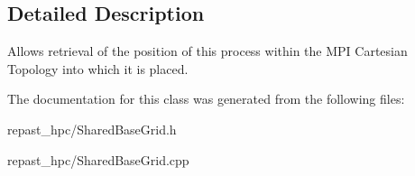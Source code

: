 \subsection{Detailed Description}
Allows retrieval of the position of this process within the M\-P\-I Cartesian Topology into which it is placed. 

The documentation for this class was generated from the following files\-:\begin{DoxyCompactItemize}
\item 
repast\-\_\-hpc/Shared\-Base\-Grid.\-h\item 
repast\-\_\-hpc/Shared\-Base\-Grid.\-cpp\end{DoxyCompactItemize}

